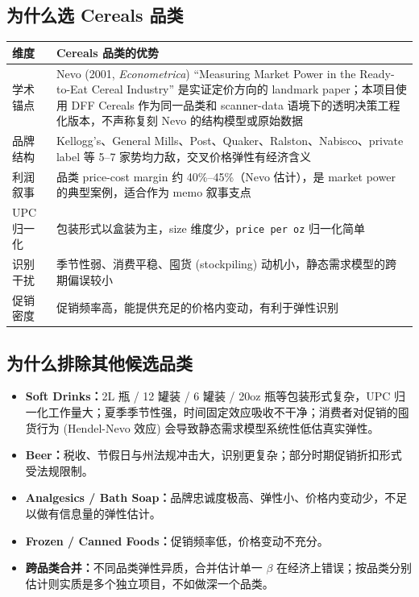 \documentclass[UTF8,11pt,a4paper,fontset=none]{ctexart}
\begin{document}
\subsection{为什么选 Cereals 品类}

\begin{tabularx}{\textwidth}{L{3.2cm}Y}
\toprule
维度 & Cereals 品类的优势 \\
\midrule
学术锚点 & Nevo (2001, \textit{Econometrica}) ``Measuring Market Power in the Ready-to-Eat Cereal Industry'' 是实证定价方向的 landmark paper；本项目使用 DFF Cereals 作为同一品类和 scanner-data 语境下的透明决策工程化版本，不声称复刻 Nevo 的结构模型或原始数据 \\
品牌结构 & Kellogg's、General Mills、Post、Quaker、Ralston、Nabisco、private label 等 5--7 家势均力敌，交叉价格弹性有经济含义 \\
利润叙事 & 品类 price-cost margin 约 40\%--45\%（Nevo 估计），是 market power 的典型案例，适合作为 memo 叙事支点 \\
UPC 归一化 & 包装形式以盒装为主，size 维度少，\texttt{price per oz} 归一化简单 \\
识别干扰 & 季节性弱、消费平稳、囤货 (stockpiling) 动机小，静态需求模型的跨期偏误较小 \\
促销密度 & 促销频率高，能提供充足的价格内变动，有利于弹性识别 \\
\bottomrule
\end{tabularx}

\subsection{为什么排除其他候选品类}

\begin{itemize}
  \item \textbf{Soft Drinks：}2L 瓶 / 12 罐装 / 6 罐装 / 20oz 瓶等包装形式复杂，UPC 归一化工作量大；夏季季节性强，时间固定效应吸收不干净；消费者对促销的囤货行为 (Hendel-Nevo 效应) 会导致静态需求模型系统性低估真实弹性。
  \item \textbf{Beer：}税收、节假日与州法规冲击大，识别更复杂；部分时期促销折扣形式受法规限制。
  \item \textbf{Analgesics / Bath Soap：}品牌忠诚度极高、弹性小、价格内变动少，不足以做有信息量的弹性估计。
  \item \textbf{Frozen / Canned Foods：}促销频率低，价格变动不充分。
  \item \textbf{跨品类合并：}不同品类弹性异质，合并估计单一 $\beta$ 在经济上错误；按品类分别估计则实质是多个独立项目，不如做深一个品类。
\end{itemize}
\end{document}
